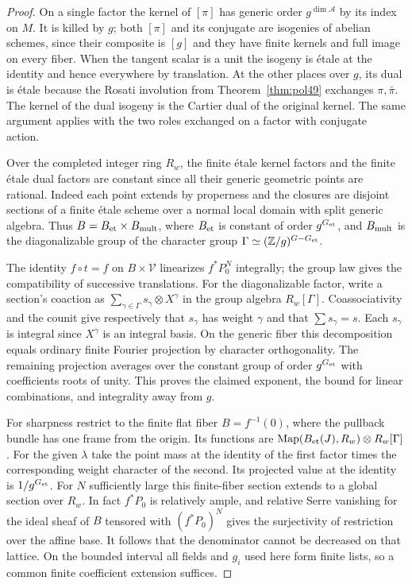 \documentclass[a4paper,11pt]{article}
\theoremstyle{definition}
\theoremstyle{remark}
\newcommand{\ZZ}{\mathbb Z}\newcommand{\ord}{\operatorname{ord}}
\numberwithin{equation}{section}
\begin{document}
\begin{proof}
On a single factor the kernel of \([\pi]\) has generic order
\(g^{\dim\mathcal A}\) by its index on \(M\). It is killed by \(g\);
both \([\pi]\) and its conjugate are isogenies of abelian schemes,
since their composite is \([g]\) and they have finite kernels and
full image on every fiber. When the tangent scalar is a unit the
isogeny is \'etale at the identity and hence everywhere by translation.
At the other places over \(g\), its dual is \'etale because the Rosati
involution from Theorem~\ref{thm:pol49} exchanges \(\pi,\bar\pi\).
The kernel of the dual isogeny is the Cartier dual of the original
kernel. The same argument applies with the two roles exchanged on a
factor with conjugate action.~\cite{XIII-X-IV-dual49}

Over the completed integer ring \(R_w\), the finite \'etale kernel
factors and the finite \'etale dual factors are constant since all
their generic geometric points are rational. Indeed each point extends
by properness and the closures are disjoint sections of a finite
\'etale scheme over a normal local domain with split generic algebra.
Thus \(B=B_{\rm et}\times B_{\rm mult}\), where
\(B_{\rm et}\) is constant of order \(g^{G_{\rm et}}\), and
\(B_{\rm mult}\) is the diagonalizable group of the character group
\(\Gamma\simeq(\ZZ/g)^{G-G_{\rm et}}\).

The identity \(f\circ t=f\) on \(B\times\mathcal V\) linearizes
\(f^*P_0^N\) integrally; the group law gives the compatibility of
successive translations. For the diagonalizable factor, write a
section's coaction as \(\sum_{\gamma\in\Gamma}s_\gamma\otimes X^\gamma\)
in the group algebra \(R_w[\Gamma]\). Coassociativity and the counit
give respectively that \(s_\gamma\) has weight \(\gamma\) and that
\(\sum s_\gamma=s\). Each \(s_\gamma\) is integral since \(X^\gamma\)
is an integral basis. On the generic fiber this decomposition equals
ordinary finite Fourier projection by character orthogonality.
The remaining projection averages over the constant group of order
\(g^{G_{\rm et}}\) with coefficients roots of unity. This proves the
claimed exponent, the bound for linear combinations, and integrality
away from \(g\).

For sharpness restrict to the finite flat fiber \(B=f^{-1}(0)\),
where the pullback bundle has one frame from the origin. Its functions
are \(\operatorname{Map}(B_{\rm et}(J),R_w)\otimes R_w[\Gamma]\).
For the given \(\lambda\) take the point mass at the identity of the
first factor times the corresponding weight character of the second.
Its projected value at the identity is \(1/g^{G_{\rm et}}\).
For \(N\) sufficiently large this finite-fiber section extends to a
global section over \(R_w\). In fact \(f^*P_0\) is relatively ample,
and relative Serre vanishing for the ideal sheaf of \(B\) tensored
with \((f^*P_0)^N\) gives the surjectivity of restriction over the
affine base. It follows that the denominator cannot be decreased on
that lattice. On the bounded interval all fields and \(g_i\) used
here form finite lists, so a common finite coefficient extension
suffices.
\end{proof}
\end{document}

